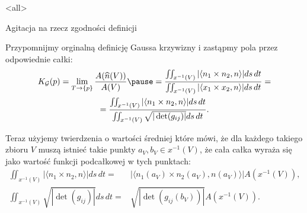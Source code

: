 \mode<all>{}
\begin{frame}[<+->]{Agitacja na rzecz zgodności definicji}



\pause Przypomnijmy orginalną definicję Gaussa krzywizny i zastąpmy pola przez odpowiednie całki:
\begin{multline*}
K_{\mathcal{G}}(p)=\lim_{T\to \{p\}}\frac{A(\widehat{n}(V))}{A(V)}\pause =\frac{\iint_{x^{-1}(V)}|\langle n_1\times n_2, n\rangle| ds\,dt}{\iint_{x^{-1}(V)}|\langle x_1\times x_2, n\rangle| ds\,dt}=\\=\frac{\iint_{x^{-1}(V)}|\langle n_1\times n_2, n\rangle|  ds\,dt}{\iint_{x^{-1}(V)}\sqrt{|\det(g_{ij})|} ds\,dt}. 
\end{multline*}
\end{frame}
\begin{frame}[<+->]
Teraz użyjemy twierdzenia o wartości średniej które mówi, że dla każdego takiego zbioru $V$ muszą istnieć takie punkty $a_V,b_V\in x^{-1}(V)$, że cała całka wyraża się jako wartość funkcji podcałkowej w tych punktach:
\pause \begin{align*}
\iint_{x^{-1}(V)}|\langle n_1\times n_2, n\rangle| ds\,dt=&|\langle n_1(a_V)\times n_2(a_V),n(a_V)\rangle| A(x^{-1}(V)),\\
\iint_{x^{-1}(V)}\sqrt{|\det(g_{ij})|} ds\,dt=& \sqrt{|\det(g_{ij}(b_V))|}A(x^{-1}(V)).
\end{align*}

\end{frame}
